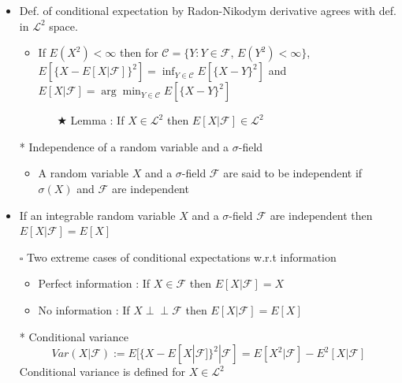 \documentclass[12pt, A4]{article}
\newcommand{\indep}{\perp \!\!\! \perp}
\newcommand{\sq}{$\square$}
\newcommand{\trick}{$\bigstar$}
\newcommand{\C}{\mathcal{C}}
\newcommand{\F}{\mathcal{F}}
\newcommand{\LL}{\mathcal{L}}
\begin{document}
\begin{itemize}
\begin{enumerate}
\begin{itemize}
		\end{itemize}
	\end{enumerate}
	\item Def. of conditional expectation by Radon-Nikodym derivative agrees with def. in $\LL^2$ space.
	\begin{itemize}
		\item If $E(X^2)<\infty$ then for  $\C=\{Y : Y\in \F, \, E(Y^2)<\infty\}$, \\ $E[\{X-E[X|\F]\}^2]=\inf_{Y\in \C} E[\{X-Y\}^2]$ and $E[X|\F]=\arg\min_{Y\in \C} E[\{X-Y\}^2]$
		\begin{itemize}
			\item[\trick] Lemma : If $X\in \LL^2$ then $E[X|\F]\in \LL^2$
		\end{itemize}
	\end{itemize}
	\item[*] Independence of a random variable and a $\sigma$-field
	\begin{itemize}
		\item A random variable $X$ and a $\sigma$-field $\F$ are said to be independent if $\sigma(X)$ and $\F$ are independent
	\end{itemize}
	\item If an integrable random variable $X$ and a $\sigma$-field $\F$ are independent then $E[X|\F]=E[X]$ 
	\item[\sq] Two extreme cases of conditional expectations w.r.t information
	\begin{itemize}
		\item Perfect information : If $X\in \F$ then $E[X|\F]=X$
		\item No information : If $X \indep \F$ then $E[X|\F]=E[X]$
	\end{itemize} 
	\item[*] Conditional variance
	\begin{equation*}
		Var(X|\F):=E[\{X-E[X|\F]\}^2|\F] = E[X^2|\F]-E^2[X|\F]
	\end{equation*}
	Conditional variance is defined for $X\in \LL^2$
	
\end{itemize}
\clearpage 
\end{document}
